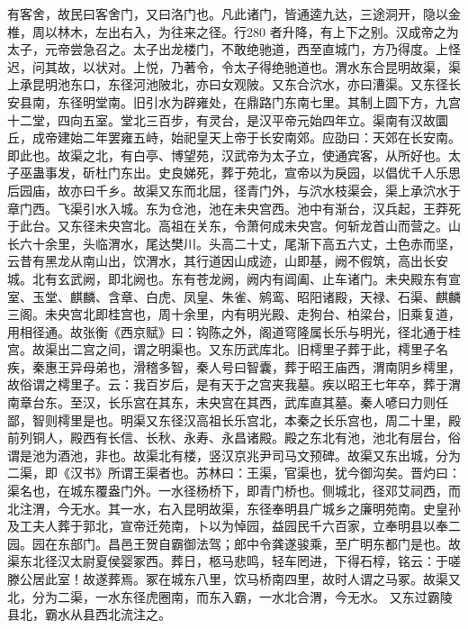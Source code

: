 \documentclass[12pt,UTF8]{ctexbook}
\begin{document}
有客舍，故民曰客舍门，又曰洛门也。凡此诸门，皆通逵九达，三途洞开，隐以金椎，周以林木，左出右入，为往来之径。行280 者升降，有上下之别。汉成帝之为太子，元帝尝急召之。太子出龙楼门，不敢绝驰道，西至直城门，方乃得度。上怪迟，问其故，以状对。上悦，乃著令，令太子得绝驰道也。渭水东合昆明故渠，渠上承昆明池东口，东径河池陂北，亦曰女观陂。又东合泬水，亦曰漕渠。又东径长安县南，东径明堂南。旧引水为辟雍处，在鼎路门东南七里。其制上圆下方，九宫十二堂，四向五室。堂北三百步，有灵台，是汉平帝元始四年立。渠南有汉故圜丘，成帝建始二年罢雍五峙，始祀皇天上帝于长安南郊。应劭曰：天郊在长安南。即此也。故渠之北，有白亭、博望苑，汉武帝为太子立，使通宾客，从所好也。太子巫蛊事发，斫杜门东出。史良娣死，葬于苑北，宣帝以为戾园，以倡优千人乐思后园庙，故亦曰千乡。故渠又东而北屈，径青门外，与泬水枝渠会，渠上承泬水于章门西。飞渠引水入城。东为仓池，池在未央宫西。池中有渐台，汉兵起，王莽死于此台。又东径未央宫北。高祖在关东，令萧何成未央宫。何斩龙首山而营之。山长六十余里，头临渭水，尾达樊川。头高二十丈，尾渐下高五六丈，土色赤而坚，云昔有黑龙从南山出，饮渭水，其行道因山成迹，山即基，阙不假筑，高出长安城。北有玄武阙，即北阙也。东有苍龙阙，阙内有阊阖、止车诸门。未央殿东有宣室、玉堂、麒麟、含章、白虎、凤皇、朱雀、鹓鸾、昭阳诸殿，天禄、石渠、麒麟三阁。未央宫北即桂宫也，周十余里，内有明光殿、走狗台、柏梁台，旧乘复道，用相径通。故张衡《西京赋》曰：钩陈之外，阁道穹隆属长乐与明光，径北通于桂宫。故渠出二宫之间，谓之明渠也。又东历武库北。旧樗里子葬于此，樗里子名疾，秦惠王异母弟也，滑稽多智，秦人号曰智囊，葬于昭王庙西，渭南阴乡樗里，故俗谓之樗里子。云：我百岁后，是有天于之宫夹我墓。疾以昭王七年卒，葬于渭南章台东。至汉，长乐宫在其东，未央宫在其西，武库直其墓。秦人喭曰力则任鄙，智则樗里是也。明渠又东径汉高祖长乐宫北，本秦之长乐宫也，周二十里，殿前列铜人，殿西有长信、长秋、永寿、永昌诸殿。殿之东北有池，池北有层台，俗谓是池为酒池，非也。故渠北有楼，竖汉京兆尹司马文预碑。故渠又东出城，分为二渠，即《汉书》所谓王渠者也。苏林曰：王渠，官渠也，犹今御沟矣。晋灼曰：渠名也，在城东覆盎门外。一水径杨桥下，即青门桥也。侧城北，径邓艾祠西，而北注渭，今无水。其一水，右入昆明故渠，东径奉明县广城乡之廉明苑南。史皇孙及工夫人葬于郭北，宣帝迁苑南，卜以为悼园，益园民千六百家，立奉明县以奉二园。园在东部门。昌邑王贺自霸御法驾；郎中令龚遂骏乘，至广明东都门是也。故渠东北径汉太尉夏侯婴冢西。葬日，柩马悲鸣，轻车罔进，下得石椁，铭云：于嗟滕公居此室！故遂葬焉。冢在城东八里，饮马桥南四里，故时人谓之马冢。故渠又北，分为二渠，一水东径虎圈南，而东入霸，一水北合渭，今无水。
又东过霸陵县北，霸水从县西北流注之。
\end{document}
